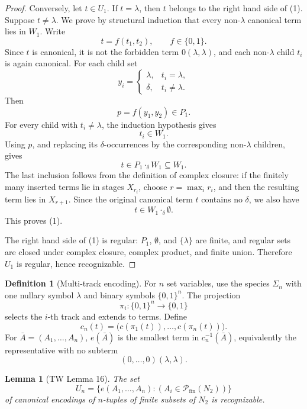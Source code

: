 \documentclass[11pt]{article}
\newtheorem{lemma}[theorem]{Lemma}
\theoremstyle{definition}
\newtheorem{definition}[theorem]{Definition}
\newcommand{\powfin}{\mathcal P_{\mathrm{fin}}}
\begin{document}
\begin{proof}
Conversely, let \(t\in U_1\).  If \(t=\lambda\), then \(t\) belongs to the
right hand side of (1).  Suppose \(t\ne\lambda\).  We prove by structural
induction that every non-\(\lambda\) canonical term lies in \(W_1\).  Write
\[
  t=f(t_1,t_2),\qquad f\in\{0,1\}.
\]
Since \(t\) is canonical, it is not the forbidden term \(0(\lambda,\lambda)\),
and each non-\(\lambda\) child \(t_i\) is again canonical.  For each child set
\[
  y_i=
  \begin{cases}
    \lambda, & t_i=\lambda,\\
    \delta, & t_i\ne\lambda.
  \end{cases}
\]
Then
\[
  p=f(y_1,y_2)\in P_1.
\]
For every child with \(t_i\ne\lambda\), the induction hypothesis gives
\[
  t_i\in W_1.
\]
Using \(p\), and replacing its \(\delta\)-occurrences by the corresponding
non-\(\lambda\) children, gives
\[
  t\in P_1\cdot_\delta W_1\subseteq W_1.
\]
The last inclusion follows from the definition of complex closure: if the
finitely many inserted terms lie in stages \(X_{r_i}\), choose
\(r=\max_i r_i\), and then the resulting term lies in \(X_{r+1}\).  Since the
original canonical term \(t\) contains no \(\delta\), we also have
\[
  t\in W_1\cdot_\delta\emptyset.
\]
This proves (1).

The right hand side of (1) is regular: \(P_1\), \(\emptyset\), and
\(\{\lambda\}\) are finite, and regular sets are closed under complex closure,
complex product, and finite union.  Therefore \(U_1\) is regular, hence
recognizable.
\end{proof}

\begin{definition}[Multi-track encoding]
For \(n\) set variables, use the species \(\Sigma_n\) with one nullary symbol
\(\lambda\) and binary symbols \(\{0,1\}^n\).  The projection
\[
  \pi_i:\{0,1\}^n\to\{0,1\}
\]
selects the \(i\)-th track and extends to terms.  Define
\[
  c_n(t)=\bigl(c(\pi_1(t)),\ldots,c(\pi_n(t))\bigr).
\]
For \(\bar A=(A_1,\ldots,A_n)\), \(e(\bar A)\) is the smallest term in
\(c_n^{-1}(\bar A)\), equivalently the representative with no subterm
\[
  (0,\ldots,0)(\lambda,\lambda).
\]
\end{definition}

\begin{lemma}[TW Lemma 16]\label{lem:tw-encoding-n}
The set
\[
  U_n=\{e(A_1,\ldots,A_n):(A_i\in\powfin(N_2))\}
\]
of canonical encodings of \(n\)-tuples of finite subsets of \(N_2\) is
recognizable.
\end{lemma}
\end{document}
